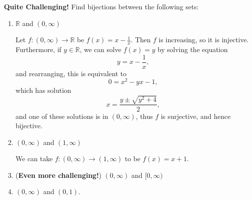 \documentclass[11pt,dvipsnames]{book}
\def\R{\mathbb{R}}
\def\C{{\mathbb{C}}}
\numberwithin{equation}{section} %
\numberwithin{figure}{section} %
\numberwithin{table}{section} %
\begin{document}
%
%
%



\begin{exercise} {\bf Quite Challenging!} Find bijections between the following sets:

\begin{enumerate}[label=(\alph*)]
\item $\R$ and $(0,\infty)$

\begin{solution}
Let $f:(0,\infty) \rightarrow \R $ be $f(x)=x-\frac{1}{x}$. Then $f$ is increasing, so it is injective. Furthermore, if $y\in \R$, we can solve $f(x)=y$ by solving the equation
\[
y= x-\frac{1}{x},
\]
and rearranging, this is equivalent to 
\[
0=x^2-yx-1,\]
which has solution
\[
x=\frac{y\pm\sqrt{y^2+4}}{2},\]
and one of these solutions is in $(0,\infty)$, thus $f$ is surjective, and hence bijective. 
\end{solution}

\item $(0,\infty)$ and $(1,\infty)$

\begin{solution}
We can take $f:(0,\infty)\rightarrow (1,\infty)$ to be $f(x)=x+1$. 
\end{solution}

\item ({\bf Even more challenging!}) $(0,\infty)$ and $[0,\infty)$

\item $(0,\infty)$ and $(0,1)$.
\end{enumerate}



\end{exercise}
\end{document}
